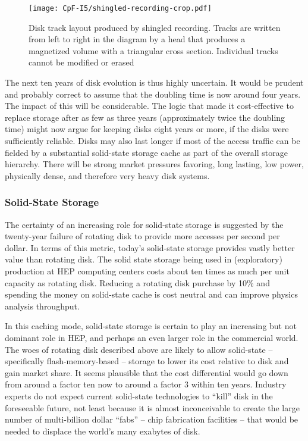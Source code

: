 \begin{figure}[h]
\centering
\texttt{[image: CpF-I5/shingled-recording-crop.pdf]}
\caption{Disk track layout produced by shingled recording.  Tracks are written from left to right in the diagram by a head that produces a magnetized volume with a triangular cross section. Individual tracks cannot be modified or erased}
\label{fig:shingled-recording}
\end{figure}

The next ten years of disk evolution is thus highly uncertain.  It would be 
prudent and probably correct to assume that the doubling time is now around four 
years.  The impact of this will be considerable.  The logic that made it 
cost-effective to replace storage after as few as three years (approximately 
twice the doubling time) might now argue for keeping disks eight years or more, 
if the disks were sufficiently reliable.  Disks may also last longer if most of 
the access traffic can be fielded by a substantial solid-state storage cache as 
part of the overall storage hierarchy. There will be strong market pressures 
favoring, long lasting, low power, physically dense, and therefore very heavy 
disk systems.

\subsubsection{Solid-State Storage}
The certainty of an increasing role for solid-state storage is suggested by 
the twenty-year failure of rotating disk to provide more accesses per second 
per dollar.  In terms of this metric, today's solid-state storage provides 
vastly better value than rotating disk.  The solid state storage being used 
in (exploratory) production at HEP computing centers costs about ten times as 
much per unit capacity as rotating disk.  Reducing a rotating disk purchase 
by 10\% and spending the money on solid-state cache is cost neutral and can 
improve physics analysis throughput.

In this caching mode, solid-state storage is certain to play an increasing but not 
dominant role in HEP, and perhaps an even larger role in the commercial world.  
The woes of rotating disk described above are likely to allow solid-state -- 
specifically flash-memory-based -- storage to lower its cost relative to disk 
and gain market share.  It seems plausible that the cost differential would 
go down from around a factor ten now to around a factor 3 within ten years.  
Industry experts do not expect current solid-state technologies to “kill” disk 
in the foreseeable future, not least because it is almost inconceivable to 
create the large number of multi-billion dollar ``fabs'' -- chip fabrication 
facilities -- that would be needed to displace the world's many exabytes of disk.

